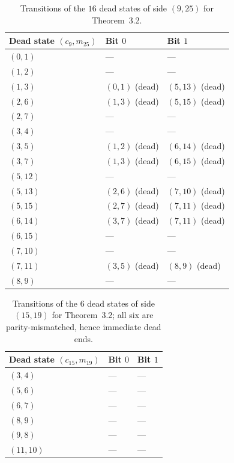\documentclass[11pt]{article}
\begin{document}
\begin{table}[ht]
\centering
\small
\begin{tabular}{lll}
\hline
Dead state $(c_9, m_{25})$ & Bit $0$ & Bit $1$ \\
\hline
$(0,1)$ & --- & --- \\
$(1,2)$ & --- & --- \\
$(1,3)$ & $(0,1)$ (dead) & $(5,13)$ (dead) \\
$(2,6)$ & $(1,3)$ (dead) & $(5,15)$ (dead) \\
$(2,7)$ & --- & --- \\
$(3,4)$ & --- & --- \\
$(3,5)$ & $(1,2)$ (dead) & $(6,14)$ (dead) \\
$(3,7)$ & $(1,3)$ (dead) & $(6,15)$ (dead) \\
$(5,12)$ & --- & --- \\
$(5,13)$ & $(2,6)$ (dead) & $(7,10)$ (dead) \\
$(5,15)$ & $(2,7)$ (dead) & $(7,11)$ (dead) \\
$(6,14)$ & $(3,7)$ (dead) & $(7,11)$ (dead) \\
$(6,15)$ & --- & --- \\
$(7,10)$ & --- & --- \\
$(7,11)$ & $(3,5)$ (dead) & $(8,9)$ (dead) \\
$(8,9)$ & --- & --- \\
\hline
\end{tabular}
\caption{Transitions of the $16$ dead states of side $(9,25)$ for Theorem~3.2.}
\label{tab:app-32d9}
\end{table}

\begin{table}[ht]
\centering
\small
\begin{tabular}{lll}
\hline
Dead state $(c_{15}, m_{19})$ & Bit $0$ & Bit $1$ \\
\hline
$(3,4)$ & --- & --- \\
$(5,6)$ & --- & --- \\
$(6,7)$ & --- & --- \\
$(8,9)$ & --- & --- \\
$(9,8)$ & --- & --- \\
$(11,10)$ & --- & --- \\
\hline
\end{tabular}
\caption{Transitions of the $6$ dead states of side $(15,19)$ for Theorem~3.2; all six are parity-mismatched, hence immediate dead ends.}
\label{tab:app-32d15}
\end{table}
\end{document}
